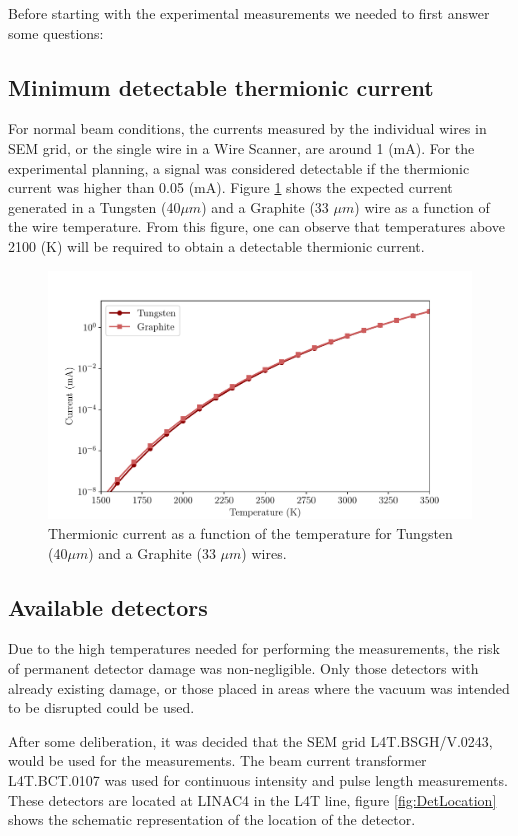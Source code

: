 Before starting with the experimental measurements we needed to first answer some questions: 

\subsection{Minimum detectable thermionic current}

For normal beam conditions, the currents measured by the individual wires in SEM grid, or the single wire in a Wire Scanner, are around 1 (mA). For the experimental planning, a signal was considered detectable if the thermionic current was higher than 0.05 (mA). Figure \ref{fig:ThermCurrent} shows the expected current generated in a Tungsten (40$\mu m$) and a Graphite (33 $\mu m$) wire as a function of the wire temperature. From this figure, one can observe that temperatures above 2100 (K) will be required to obtain a detectable thermionic current.  

\begin{figure}[h]
    \centering
    \includegraphics[width=0.80\columnwidth]{Figure_ThermoionicCurrent/ThermoCurrent.pdf}
    \caption{Thermionic current as a function of the temperature for Tungsten (40$\mu m$) and a Graphite (33 $\mu m$) wires.}
    \label{fig:ThermCurrent}
\end{figure}

\subsection{Available detectors}

Due to the high temperatures needed for performing the measurements, the risk of permanent detector damage was non-negligible. Only those detectors with already existing damage, or those placed in areas where the vacuum was intended to be disrupted could be used. 

After some deliberation, it was decided that the SEM grid L4T.BSGH/V.0243, would be used for the measurements. The beam current transformer L4T.BCT.0107 was used for continuous intensity and pulse length measurements. These detectors are located at LINAC4 in the L4T line, figure \ref{fig:DetLocation} shows the schematic representation of the location of the detector. 


